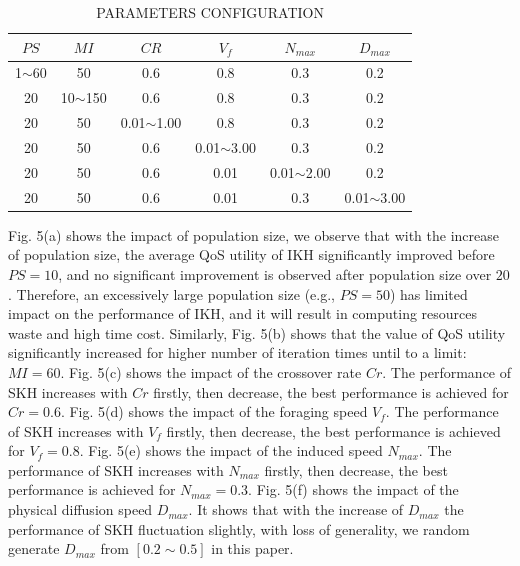 \documentclass[10pt,journal,compsoc]{IEEEtran}
\begin{document}
\begin{table}[!t]
\renewcommand{\arraystretch}{1.3}
\caption{PARAMETERS CONFIGURATION}
\label{table_example}
\centering
\begin{tabular}{cccccc}
\hline
\bfseries $PS$ & \bfseries $MI$ & \bfseries $CR$ & \bfseries $V_f$ & \bfseries $N_{max}$ & \bfseries $D_{max}$ \\
\hline
1$\sim$60 & 50          & 0.6            & 0.8            &  0.3            &  0.2 \\
20        & 10$\sim$150 & 0.6            & 0.8            &  0.3            &  0.2 \\
20        & 50          & 0.01$\sim$1.00 & 0.8            &  0.3            &  0.2 \\
20        & 50          & 0.6            & 0.01$\sim$3.00 &  0.3            &  0.2 \\
20        & 50          & 0.6            & 0.01           &  0.01$\sim$2.00 &  0.2 \\
20        & 50          & 0.6            & 0.01           &  0.3            &  0.01$\sim$3.00 \\
\hline
\end{tabular}
\end{table}

Fig. 5(a) shows the impact of population size, we observe that with the increase of population size, the average QoS utility of IKH significantly improved before $PS=10$, and no significant improvement is observed after population size over $20$. Therefore, an excessively large population size (e.g., $PS=50$) has limited impact on the performance of IKH, and it will result in computing resources waste and high time cost.
Similarly, Fig. 5(b) shows that the value of QoS utility significantly increased for higher number of iteration times until to a limit: $MI = 60$. 
Fig. 5(c) shows the impact of the crossover rate $Cr$. The performance of SKH increases with $Cr$ firstly, then decrease, the best performance is achieved for $Cr = 0.6$.
Fig. 5(d) shows the impact of the foraging speed $V_f$. The performance of SKH increases with $V_f$ firstly, then decrease, the best performance is achieved for $V_f = 0.8$.
Fig. 5(e) shows the impact of the induced speed $N_{max}$. The performance of SKH increases with $N_{max}$ firstly, then decrease, the best performance is achieved for $N_{max} = 0.3$.
Fig. 5(f) shows the impact of the physical diffusion speed $D_{max}$. It shows that with the increase of $D_{max}$ the performance of SKH fluctuation slightly, with loss of generality, we random generate $D_{max}$ from $[0.2 \sim 0.5]$ in this paper.
\end{document}
